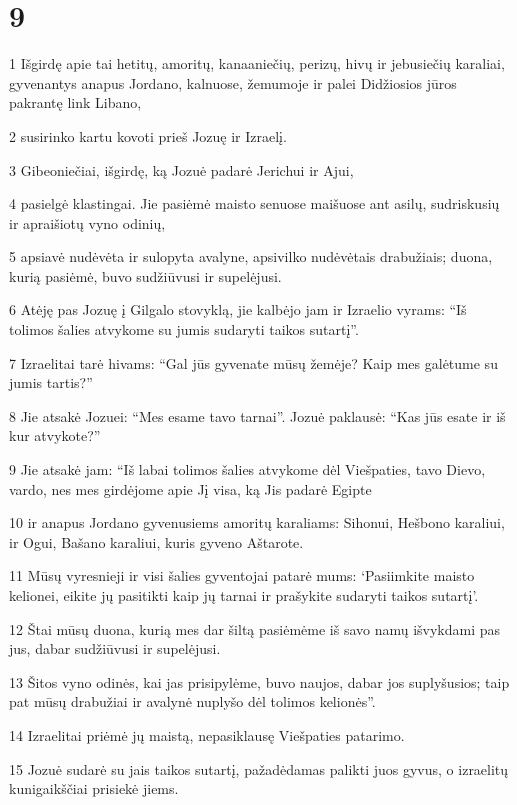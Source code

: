 \chapter{9}

\par 1 Išgirdę apie tai hetitų, amoritų, kanaaniečių, perizų, hivų ir jebusiečių karaliai, gyvenantys anapus Jordano, kalnuose, žemumoje ir palei Didžiosios jūros pakrantę link Libano, 
\par 2 susirinko kartu kovoti prieš Jozuę ir Izraelį. 
\par 3 Gibeoniečiai, išgirdę, ką Jozuė padarė Jerichui ir Ajui, 
\par 4 pasielgė klastingai. Jie pasiėmė maisto senuose maišuose ant asilų, sudriskusių ir apraišiotų vyno odinių, 
\par 5 apsiavė nudėvėta ir sulopyta avalyne, apsivilko nudėvėtais drabužiais; duona, kurią pasiėmė, buvo sudžiūvusi ir supelėjusi. 
\par 6 Atėję pas Jozuę į Gilgalo stovyklą, jie kalbėjo jam ir Izraelio vyrams: “Iš tolimos šalies atvykome su jumis sudaryti taikos sutartį”. 
\par 7 Izraelitai tarė hivams: “Gal jūs gyvenate mūsų žemėje? Kaip mes galėtume su jumis tartis?” 
\par 8 Jie atsakė Jozuei: “Mes esame tavo tarnai”. Jozuė paklausė: “Kas jūs esate ir iš kur atvykote?” 
\par 9 Jie atsakė jam: “Iš labai tolimos šalies atvykome dėl Viešpaties, tavo Dievo, vardo, nes mes girdėjome apie Jį visa, ką Jis padarė Egipte 
\par 10 ir anapus Jordano gyvenusiems amoritų karaliams: Sihonui, Hešbono karaliui, ir Ogui, Bašano karaliui, kuris gyveno Aštarote. 
\par 11 Mūsų vyresnieji ir visi šalies gyventojai patarė mums: ‘Pasiimkite maisto kelionei, eikite jų pasitikti kaip jų tarnai ir prašykite sudaryti taikos sutartį’. 
\par 12 Štai mūsų duona, kurią mes dar šiltą pasiėmėme iš savo namų išvykdami pas jus, dabar sudžiūvusi ir supelėjusi. 
\par 13 Šitos vyno odinės, kai jas prisipylėme, buvo naujos, dabar jos suplyšusios; taip pat mūsų drabužiai ir avalynė nuplyšo dėl tolimos kelionės”. 
\par 14 Izraelitai priėmė jų maistą, nepasiklausę Viešpaties patarimo. 
\par 15 Jozuė sudarė su jais taikos sutartį, pažadėdamas palikti juos gyvus, o izraelitų kunigaikščiai prisiekė jiems. 

